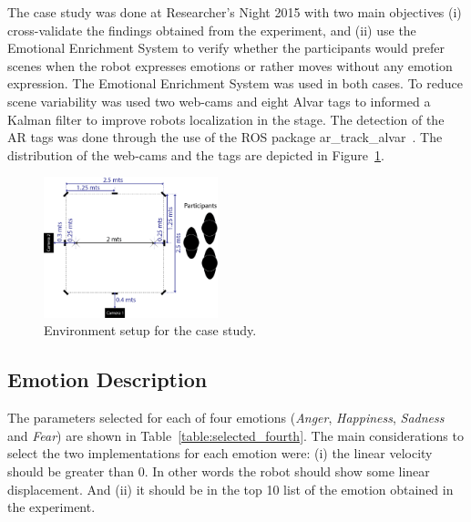 The case study was done at Researcher's Night 2015 with two main objectives (i) cross-validate the findings obtained from the experiment, and (ii) use the Emotional Enrichment System to verify whether the participants would prefer scenes when the robot expresses emotions or rather moves without any emotion expression. The Emotional Enrichment System was used in both cases. To reduce scene variability was used two web-cams and eight Alvar tags to informed a Kalman filter to improve robots localization in the stage. The detection of the AR tags was done through the use of the ROS package ar\_track\_alvar~\cite{artag2015}. The distribution of the web-cams and the tags are depicted in Figure~\ref{fig:setup_fourth}. 

\begin{figure}
	\centering
	\includegraphics[width=0.45\textwidth]{./Images/FourthCase.png} 
	\caption{Environment setup for the case study.}
	\label{fig:setup_fourth}
\end{figure}

\subsection{Emotion Description}

The parameters selected for each of four emotions (\textit{Anger}, \textit{Happiness}, \textit{Sadness} and \textit{Fear}) are shown in Table~\ref{table:selected_fourth}. The main considerations to select the two implementations for each emotion were: (i) the linear velocity should be greater than $0$. In other words the robot should show some linear displacement. And (ii) it should be in the top 10 list of the emotion obtained in the experiment.

